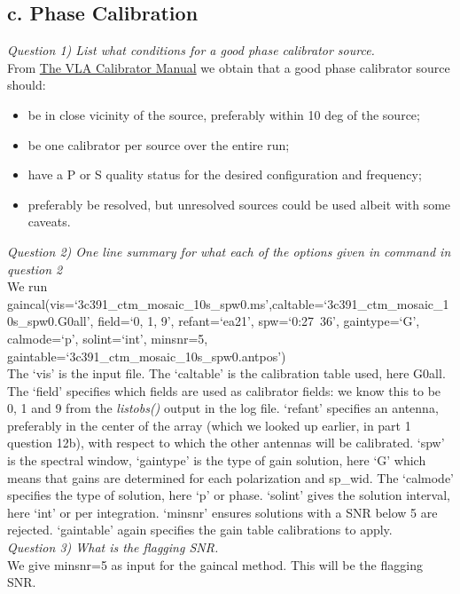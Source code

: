 \documentclass[12pt, a4paper]{article}
\begin{document}
\subsection{c. Phase Calibration}
\noindent \textit{Question 1) List what conditions for a good phase calibrator source.} \\
From \href{https://science.nrao.edu/facilities/vla/docs/manuals/cal/referencemanual-all-pages}{The VLA Calibrator Manual} we obtain that a good phase calibrator source should: 
\begin{itemize}
    \item be in close vicinity of the source, preferably within 10 deg of the source;
    \item be one calibrator per source over the entire run;
    \item have a P or S quality status for the desired configuration and frequency;
    \item preferably be resolved, but unresolved sources could be used albeit with some caveats.
\end{itemize}

\noindent \textit{Question 2) One line summary for what each of the options given in command in question 2} \\
We run {\tiny gaincal(vis=`3c391\_ctm\_mosaic\_10s\_spw0.ms',caltable=`3c391\_ctm\_mosaic\_10s\_spw0.G0all', field=`0, 1, 9', refant=`ea21', spw=`0:27~36',  gaintype=`G', calmode=`p', solint=`int', minsnr=5, gaintable=\lbrack `3c391\_ctm\_mosaic\_10s\_spw0.antpos'\rbrack) } \\
The `vis' is the input file. The `caltable' is the calibration table used, here G0all. The `field' specifies which fields are used as calibrator fields: we know this to be 0, 1 and 9 from the \emph{listobs()} output in the log file. `refant' specifies an antenna, preferably in the center of the array (which we looked up earlier, in part 1 question 12b), with respect to which the other antennas will be calibrated. `spw' is the spectral window, `gaintype' is the type of gain solution, here `G' which means that gains are determined for each polarization and sp\_wid. The `calmode' specifies the type of solution, here `p' or phase. `solint' gives the solution interval, here `int' or per integration. `minsnr' ensures solutions with a SNR below 5 are rejected. `gaintable' again specifies the gain table calibrations to apply. \\

\noindent \textit{Question 3) What is the flagging SNR.} \\
We give minsnr=5 as input for the gaincal method. This will be the flagging SNR. \\
\end{document}
